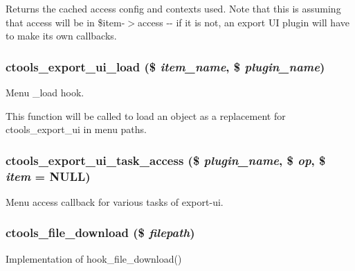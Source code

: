 Returns the cached access config and contexts used. Note that this is assuming that access will be in \$item-\/$>$access -\/-\/ if it is not, an export UI plugin will have to make its own callbacks. \hypertarget{ctools_8module_a9aa80761de735e1b6d9d1fbac0da04ad}{
\subsubsection[{ctools\_\-export\_\-ui\_\-load}]{\setlength{\rightskip}{0pt plus 5cm}ctools\_\-export\_\-ui\_\-load (\$ {\em item\_\-name}, \/  \$ {\em plugin\_\-name})}}
\label{ctools_8module_a9aa80761de735e1b6d9d1fbac0da04ad}
Menu \_\-load hook.

This function will be called to load an object as a replacement for ctools\_\-export\_\-ui in menu paths. \hypertarget{ctools_8module_a5e2e7c8a0fb252f056d980a6d6cc1e53}{
\subsubsection[{ctools\_\-export\_\-ui\_\-task\_\-access}]{\setlength{\rightskip}{0pt plus 5cm}ctools\_\-export\_\-ui\_\-task\_\-access (\$ {\em plugin\_\-name}, \/  \$ {\em op}, \/  \$ {\em item} = {\ttfamily NULL})}}
\label{ctools_8module_a5e2e7c8a0fb252f056d980a6d6cc1e53}
Menu access callback for various tasks of export-\/ui. \hypertarget{ctools_8module_ae5e454efdea69c33f8faf0d461dce188}{
\subsubsection[{ctools\_\-file\_\-download}]{\setlength{\rightskip}{0pt plus 5cm}ctools\_\-file\_\-download (\$ {\em filepath})}}
\label{ctools_8module_ae5e454efdea69c33f8faf0d461dce188}
Implementation of hook\_\-file\_\-download()

